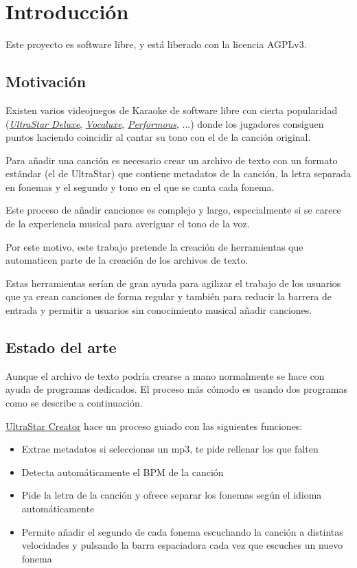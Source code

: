 \chapter{Introducción}

Este proyecto es software libre, y está liberado con la licencia AGPLv3\cite{agpl}.

\section{Motivación}

Existen varios videojuegos de Karaoke de software libre con cierta popularidad (\href{https://github.com/UltraStar-Deluxe/USDX}{\textit{UltraStar Deluxe}}, \href{https://github.com/Vocaluxe/Vocaluxe}{\textit{Vocaluxe}}, \href{https://github.com/performous/performous}{\textit{Performous}}, ...) donde los jugadores consiguen puntos haciendo coincidir al cantar su tono con el de la canción original.

Para añadir una canción es necesario crear un archivo de texto con un formato estándar (el de UltraStar) que contiene metadatos de la canción, la letra separada en fonemas y el segundo y tono en el que se canta cada fonema.

Este proceso de añadir canciones es complejo y largo, especialmente si se carece de la experiencia musical para averiguar el tono de la voz.

Por este motivo, este trabajo pretende la creación de herramientas que automaticen parte de la creación de los archivos de texto.

Estas herramientas serían de gran ayuda para agilizar el trabajo de los usuarios que ya crean canciones de forma regular y también para reducir la barrera de entrada y permitir a usuarios sin conocimiento musical añadir canciones.

\section{Estado del arte}

Aunque el archivo de texto podría crearse a mano normalmente se hace con ayuda de programas dedicados. El proceso más cómodo es usando dos programas como se describe a continuación.

\href{https://github.com/UltraStar-Deluxe/UltraStar-Creator}{UltraStar Creator} hace un proceso guiado con las siguientes funciones:

\begin{itemize}
	\item Extrae metadatos si seleccionas un mp3, te pide rellenar los que falten
	\item Detecta automáticamente el BPM de la canción
	\item Pide la letra de la canción y ofrece separar los fonemas según el idioma automáticamente
	\item Permite añadir el segundo de cada fonema escuchando la canción a distintas velocidades y pulsando la barra espaciadora cada vez que escuches un nuevo fonema
\end{itemize}

